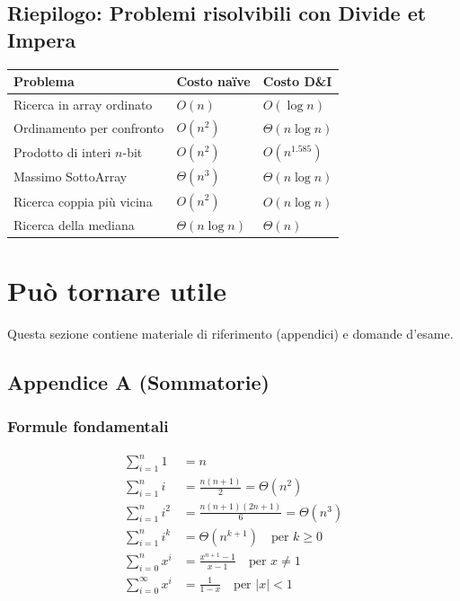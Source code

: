 \documentclass[a4paper, 11pt]{article}
\theoremstyle{definition}
\theoremstyle{remark}
\theoremstyle{remark}
\begin{document}
	\subsection{Riepilogo: Problemi risolvibili con Divide et Impera}
	
	\begin{center}
		\renewcommand{\arraystretch}{1.4}
		\begin{tabular}{lll}
			\toprule
			\textbf{Problema} & \textbf{Costo naïve} & \textbf{Costo D\&I} \\
			\midrule
			Ricerca in array ordinato & $O(n)$          & $O(\log n)$      \\
			Ordinamento per confronto & $O(n^2)$        & $\Theta(n\log n)$\\
			Prodotto di interi $n$-bit & $O(n^2)$       & $O(n^{1.585})$   \\
			Massimo SottoArray        & $\Theta(n^3)$   & $\Theta(n\log n)$\\
			Ricerca coppia più vicina  & $O(n^2)$       & $O(n\log n)$     \\
			Ricerca della mediana      & $\Theta(n\log n)$ & $\Theta(n)$   \\
			\bottomrule
		\end{tabular}
	\end{center}
	
	\section{Può tornare utile}
	
	\begin{softnote}
		Questa sezione contiene materiale di riferimento (appendici) e domande d'esame.
	\end{softnote}
	
	\subsection{Appendice A (Sommatorie)}
	
	\subsubsection{Formule fondamentali}
	
	\begin{align*}
		\sum_{i=1}^{n} 1 &= n \\
		\sum_{i=1}^{n} i &= \frac{n(n+1)}{2} = \Theta(n^2) \\
		\sum_{i=1}^{n} i^2 &= \frac{n(n+1)(2n+1)}{6} = \Theta(n^3) \\
		\sum_{i=1}^{n} i^k &= \Theta(n^{k+1}) \quad \text{per } k \geq 0 \\
		\sum_{i=0}^{n} x^i &= \frac{x^{n+1}-1}{x-1} \quad \text{per } x \neq 1 \\
		\sum_{i=0}^{\infty} x^i &= \frac{1}{1-x} \quad \text{per } |x| < 1
	\end{align*}
	
\end{document}
